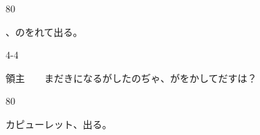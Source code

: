 \documentclass[tate,paper=b6j,jafontsize=9pt]{jlreq}
\begin{document}
\begin{azconvIndented}{8\zw}{0\zw}

、のをれて出る。

\end{azconvIndented}
\begin{azconvIndented}{4\zw}{-4\zw}

領主　　まだきになるがしたのぢゃ、がをかしてだすは？

\end{azconvIndented}
\begin{azconvIndented}{8\zw}{0\zw}

カピューレット、出る。

\end{azconvIndented}
\end{document}

